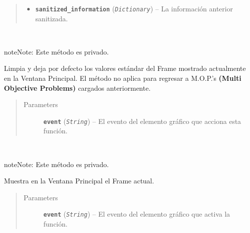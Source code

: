 \documentclass[letterpaper,10pt,english]{sphinxmanual}
\begin{document}
\begin{fulllineitems}
\begin{fulllineitems}
\begin{quote}
\begin{description}
\begin{itemize}
\item {} 
\textbf{\texttt{sanitized\_information}} (\emph{\texttt{Dictionary}}) -- La información anterior sanitizada.

\end{itemize}

\end{description}\end{quote}

\end{fulllineitems}


\begin{fulllineitems}
\label{View/MainWindow:View.MainWindow.MainWindow._MainWindow__restore_settings}~
\begin{notice}{note}{Note:}
Este método es privado.
\end{notice}

Limpia y deja por defecto los valores estándar del Frame
mostrado actualmente en la Ventana Principal.
El método no aplica para regresar a M.O.P.'s \textbf{(Multi Objective Problems)}
cargados anteriormente.
\begin{quote}\begin{description}
\item[{Parameters}] \leavevmode
\textbf{\texttt{event}} (\emph{\texttt{String}}) -- El evento del elemento gráfico que acciona esta función.

\end{description}\end{quote}

\end{fulllineitems}


\begin{fulllineitems}
\label{View/MainWindow:View.MainWindow.MainWindow._MainWindow__update_frame}~
\begin{notice}{note}{Note:}
Este método es privado.
\end{notice}

Muestra en la Ventana Principal el Frame actual.
\begin{quote}\begin{description}
\item[{Parameters}] \leavevmode
\textbf{\texttt{event}} (\emph{\texttt{String}}) -- El evento del elemento gráfico que 
activa la función.


\end{description}
\end{quote}
\end{fulllineitems}
\end{fulllineitems}
\end{document}
